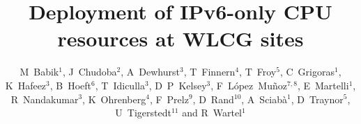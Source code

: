 \documentclass[a4paper]{jpconf}
\begin{document}
\title{Deployment of IPv6-only CPU resources at WLCG sites}


\author{M~Babik$^1$, J~Chudoba$^2$, A~Dewhurst$^3$, T~Finnern$^4$, T~Froy$^5$,
        C~Grigoras$^1$, K~Hafeez$^3$, B~Hoeft$^6$, T~Idiculla$^3$, D~P~Kelsey$^3$,  
        F~L\'opez~Mu\~noz$^{7,8}$, E~Martelli$^1$, R~Nandakumar$^3$, 
        K~Ohrenberg$^4$, F~Prelz$^{9}$, D~Rand$^{10}$, 
        A~Sciab\`a$^1$, D~Traynor$^5$, U~Tigerstedt$^{11}$ and R~Wartel$^1$}

\address{$^1$ CERN, CH-1211 Gen\`eve 23, Switzerland}
\address{$^2$ Institute of Physics, Academy of Sciences of the Czech Republic Na Slovance 2 182 21 Prague 8, Czech Republic}
\address{$^3$ STFC Rutherford Appleton Laboratory, Harwell Campus, Didcot, Oxfordshire OX11 0QX, United Kingdom}
\address{$^4$ Deutsches Elektronen-Synchrotron DESY, Notkestra\ss e 85, D-22607 Hamburg, Germany}
\address{$^5$ Queen Mary University of London, Mile End Road, London E1 4NS, United Kingdom}
\address{$^6$ Karlsruher Institut f\"ur Technologie, Hermann-von-Helmholtz-Platz 1, D-76344 Eggenstein-Leopoldshafen, Germany}
\address{$^7$ Port d'Informaci\'o Cient\'ifica, Campus UAB, Edifici D, E-08193 Bellaterra, Spain}
\address{$^8$ Also Centro de Investigaciones Energ\'eticas, Medioambientales y Tecnol\'ogicas (CIEMAT), Madrid, Spain}
\address{$^9$ INFN, Sezione di Milano, via G. Celoria 16, I-20133 Milano, Italy}
\address{$^{10}$ Imperial College London, South Kensington Campus, London SW7 2AZ, United Kingdom}
\address{$^{11}$ CSC Tieteen Tietotekniikan Keskus Oy, P.O. Box 405, FI-02101 Espoo}
  
\end{document}
